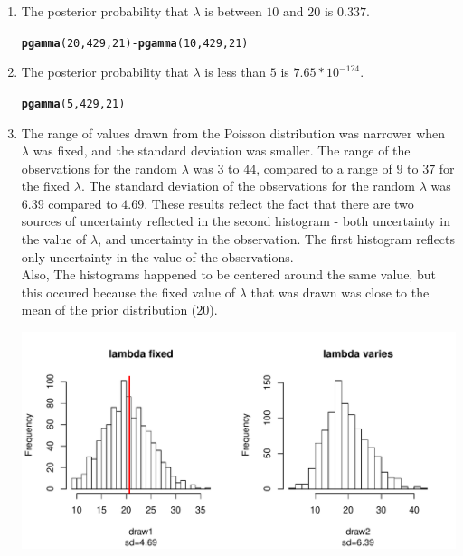 \documentclass[12pt]{article}\usepackage[]{graphicx}\usepackage[]{color}
\makeatletter
\newcommand{\hlnum}[1]{\textcolor[rgb]{0.686,0.059,0.569}{#1}}%
\newcommand{\hlopt}[1]{\textcolor[rgb]{0,0,0}{#1}}%
\newcommand{\hlstd}[1]{\textcolor[rgb]{0.345,0.345,0.345}{#1}}%
\newcommand{\hlkwd}[1]{\textcolor[rgb]{0.737,0.353,0.396}{\textbf{#1}}}%
\newenvironment{kframe}{%
 \def\at@end@of@kframe{}%
 \ifinner\ifhmode%
  \def\at@end@of@kframe{\end{minipage}}%
  \begin{minipage}{\columnwidth}%
 \fi\fi%
 \def\FrameCommand##1{\hskip\@totalleftmargin \hskip-\fboxsep
 \colorbox{shadecolor}{##1}\hskip-\fboxsep
     \hskip-\linewidth \hskip-\@totalleftmargin \hskip\columnwidth}%
 \MakeFramed {\advance\hsize-\width
   \@totalleftmargin\z@ \linewidth\hsize
   \@setminipage}}%
 {\par\unskip\endMakeFramed%
 \at@end@of@kframe}
\newenvironment{knitrout}{}{} %
\makeatother
\begin{document}
\begin{doublespacing}
\begin{enumerate}
\begin{enumerate}
\item The posterior probability that $\lambda$ is between $10$ and $20$ is $0.337$.
\begin{knitrout}\footnotesize
{}\color{fgcolor}\begin{kframe}
\begin{alltt}
\hlkwd{pgamma}\hlstd{(}\hlnum{20}\hlstd{,} \hlnum{429}\hlstd{,} \hlnum{21}\hlstd{)}\hlopt{-}\hlkwd{pgamma}\hlstd{(}\hlnum{10}\hlstd{,} \hlnum{429}\hlstd{,} \hlnum{21}\hlstd{)}
\end{alltt}
\end{kframe}
\end{knitrout}

\item The posterior probability that $\lambda$ is less than $5$ is $7.65*10^{-124}$.
\begin{knitrout}\footnotesize
{}\color{fgcolor}\begin{kframe}
\begin{alltt}
\hlkwd{pgamma}\hlstd{(}\hlnum{5}\hlstd{,} \hlnum{429}\hlstd{,} \hlnum{21}\hlstd{)}
\end{alltt}
\end{kframe}
\end{knitrout}

\item The range of values drawn from the Poisson distribution was narrower when $\lambda$ was fixed, and the standard deviation was smaller. The range of the observations for the random $\lambda$ was $3$ to $44$, compared to a range of $9$ to $37$ for the fixed $\lambda$. The standard deviation of the observations for the random $\lambda$ was $6.39$ compared to $4.69$. These results reflect the fact that there are two sources of uncertainty reflected in the second histogram - both uncertainty in the value of $\lambda$, and uncertainty in the observation. The first histogram reflects only uncertainty in the value of the observations.\\

Also, The histograms happened to be centered around the same value, but this occured because the fixed value of $\lambda$ that was drawn was close to the mean of the prior distribution ($20$). 

\begin{knitrout}\footnotesize
{}\color{fgcolor}
\includegraphics[width=\linewidth]{figure/draw-1} 


\end{knitrout}
\end{enumerate}
\end{enumerate}
\end{doublespacing}
\end{document}
